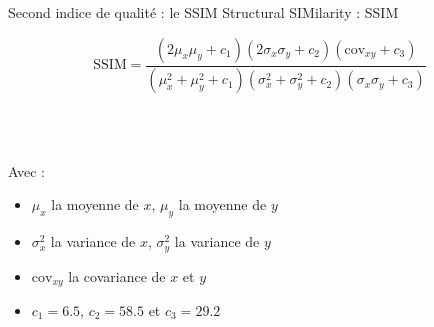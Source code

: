 \documentclass[xcolor=dvipsnames]{beamer}
\begin{document}
\begin{frame} {Second indice de qualité : le SSIM}
    \centering
    \scriptsize
    Structural SIMilarity : SSIM
    
    \[
    \text{SSIM} = \frac{(2\mu_x\mu_y + c_1)(2\sigma_x\sigma_y + c_2)(\text{cov}_{xy} + c_3)}{(\mu_x^2 + \mu_y^2 + c_1)(\sigma_x^2 + \sigma_y^2 + c_2)(\sigma_x\sigma_y + c_3)}
    \]
    
    \ \\ \
    
    Avec :
    \begin{itemize}
        \centering
        \item $\mu_x$ la moyenne de $x$, $\mu_y$ la moyenne de $y$
        \item $\sigma_x^2$ la variance de $x$, $\sigma_y^2$ la variance de $y$
        \item $\text{cov}_{xy}$ la covariance de $x$ et $y$
        \item $c_1 = 6.5$, $c_2 = 58.5$ et $c_3 = 29.2$
    \end{itemize}
    

\end{frame}
\end{document}
